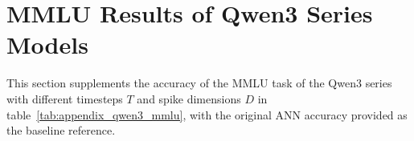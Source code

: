 \section{MMLU Results of Qwen3 Series Models}\label{overall_qwen3}
This section supplements the accuracy of the MMLU task of the Qwen3 series with different timesteps \(T\) and spike dimensions \(D\) in table~\ref{tab:appendix_qwen3_mmlu}, with the original ANN accuracy provided as the baseline reference.



